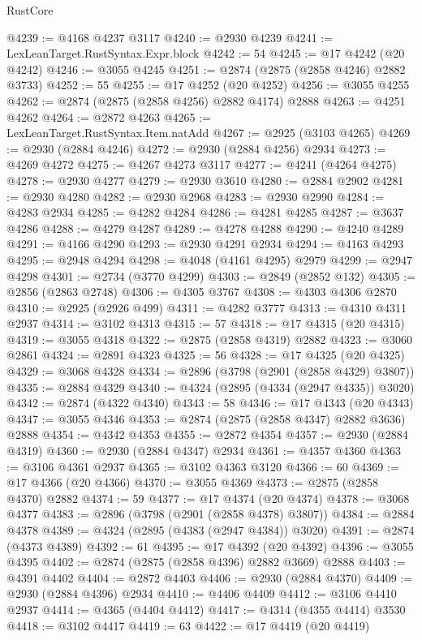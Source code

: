 \begin{lexlean}{RustCore}
\begin{coremodule}
@4239 := @4168 @4237 @3117
@4240 := @2930 @4239
@4241 := LexLeanTarget.RustSyntax.Expr.block
@4242 := 54
@4245 := @17 @4242 (@20 @4242)
@4246 := @3055 @4245
@4251 := @2874 (@2875 (@2858 @4246) @2882 @3733)
@4252 := 55
@4255 := @17 @4252 (@20 @4252)
@4256 := @3055 @4255
@4262 := @2874 (@2875 (@2858 @4256) @2882 @4174) @2888
@4263 := @4251 @4262
@4264 := @2872 @4263
@4265 := LexLeanTarget.RustSyntax.Item.natAdd
@4267 := @2925 (@3103 @4265)
@4269 := @2930 (@2884 @4246)
@4272 := @2930 (@2884 @4256) @2934
@4273 := @4269 @4272
@4275 := @4267 @4273 @3117
@4277 := @4241 (@4264 @4275)
@4278 := @2930 @4277
@4279 := @2930 @3610
@4280 := @2884 @2902
@4281 := @2930 @4280
@4282 := @2930 @2968
@4283 := @2930 @2990
@4284 := @4283 @2934
@4285 := @4282 @4284
@4286 := @4281 @4285
@4287 := @3637 @4286
@4288 := @4279 @4287
@4289 := @4278 @4288
@4290 := @4240 @4289
@4291 := @4166 @4290
@4293 := @2930 @4291 @2934
@4294 := @4163 @4293
@4295 := @2948 @4294
@4298 := @4048 (@4161 @4295) @2979
@4299 := @2947 @4298
@4301 := @2734 (@3770 @4299)
@4303 := @2849 (@2852 @132)
@4305 := @2856 (@2863 @2748)
@4306 := @4305 @3767
@4308 := @4303 @4306 @2870
@4310 := @2925 (@2926 @499)
@4311 := @4282 @3777
@4313 := @4310 @4311 @2937
@4314 := @3102 @4313
@4315 := 57
@4318 := @17 @4315 (@20 @4315)
@4319 := @3055 @4318
@4322 := @2875 (@2858 @4319) @2882
@4323 := @3060 @2861
@4324 := @2891 @4323
@4325 := 56
@4328 := @17 @4325 (@20 @4325)
@4329 := @3068 @4328
@4334 := @2896 (@3798 (@2901 (@2858 @4329) @3807))
@4335 := @2884 @4329
@4340 := @4324 (@2895 (@4334 (@2947 @4335)) @3020)
@4342 := @2874 (@4322 @4340)
@4343 := 58
@4346 := @17 @4343 (@20 @4343)
@4347 := @3055 @4346
@4353 := @2874 (@2875 (@2858 @4347) @2882 @3636) @2888
@4354 := @4342 @4353
@4355 := @2872 @4354
@4357 := @2930 (@2884 @4319)
@4360 := @2930 (@2884 @4347) @2934
@4361 := @4357 @4360
@4363 := @3106 @4361 @2937
@4365 := @3102 @4363 @3120
@4366 := 60
@4369 := @17 @4366 (@20 @4366)
@4370 := @3055 @4369
@4373 := @2875 (@2858 @4370) @2882
@4374 := 59
@4377 := @17 @4374 (@20 @4374)
@4378 := @3068 @4377
@4383 := @2896 (@3798 (@2901 (@2858 @4378) @3807))
@4384 := @2884 @4378
@4389 := @4324 (@2895 (@4383 (@2947 @4384)) @3020)
@4391 := @2874 (@4373 @4389)
@4392 := 61
@4395 := @17 @4392 (@20 @4392)
@4396 := @3055 @4395
@4402 := @2874 (@2875 (@2858 @4396) @2882 @3669) @2888
@4403 := @4391 @4402
@4404 := @2872 @4403
@4406 := @2930 (@2884 @4370)
@4409 := @2930 (@2884 @4396) @2934
@4410 := @4406 @4409
@4412 := @3106 @4410 @2937
@4414 := @4365 (@4404 @4412)
@4417 := @4314 (@4355 @4414) @3530
@4418 := @3102 @4417
@4419 := 63
@4422 := @17 @4419 (@20 @4419)

\end{coremodule}
\end{lexlean}

